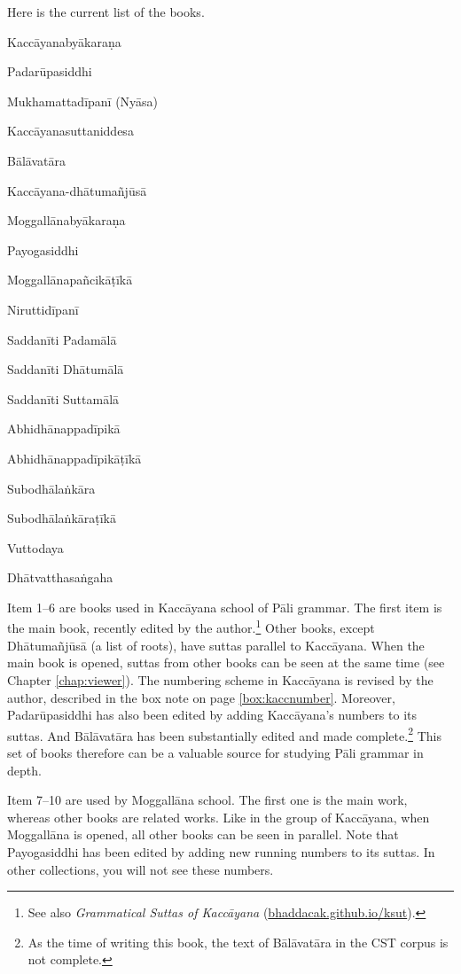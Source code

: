 Here is the current list of the books.

\begin{compactenum}
\item Kaccāyanabyākaraṇa
\item Padarūpasiddhi
\item Mukhamattadīpanī (Nyāsa)
\item Kaccāyanasuttaniddesa
\item Bālāvatāra
\item Kaccāyana-dhātumañjūsā
\item Moggallānabyākaraṇa
\item Payogasiddhi
\item Moggallānapañcikāṭīkā
\item Niruttidīpanī
\item Saddanīti Padamālā
\item Saddanīti Dhātumālā
\item Saddanīti Suttamālā
\item Abhidhānappadīpikā
\item Abhidhānappadīpikāṭīkā
\item Subodhālaṅkāra
\item Subodhālaṅkāraṭīkā
\item Vuttodaya
\item Dhātvatthasaṅgaha
\end{compactenum}

\bigskip
Item 1--6 are books used in Kaccāyana school of Pāli grammar. The first item is the main book, recently edited by the author.\footnote{See also \emph{Grammatical Suttas of Kaccāyana} (\url{bhaddacak.github.io/ksut}).} Other books, except Dhātumañjūsā (a list of roots), have suttas parallel to Kaccāyana. When the main book is opened, suttas from other books can be seen at the same time (see Chapter \ref{chap:viewer}). The numbering scheme in Kaccāyana is revised by the author, described in the box note on page \ref{box:kaccnumber}. Moreover, Padarūpasiddhi has also been edited by adding Kaccāyana's numbers to its suttas. And Bālāvatāra has been substantially edited and made complete.\footnote{As the time of writing this book, the text of Bālāvatāra in the CST corpus is not complete.} This set of books therefore can be a valuable source for studying Pāli grammar in depth.

Item 7--10 are used by Moggallāna school. The first one is the main work, whereas other books are related works. Like in the group of Kaccāyana, when Moggallāna is opened, all other books can be seen in parallel. Note that Payogasiddhi has been edited by adding new running numbers to its suttas. In other collections, you will not see these numbers.

